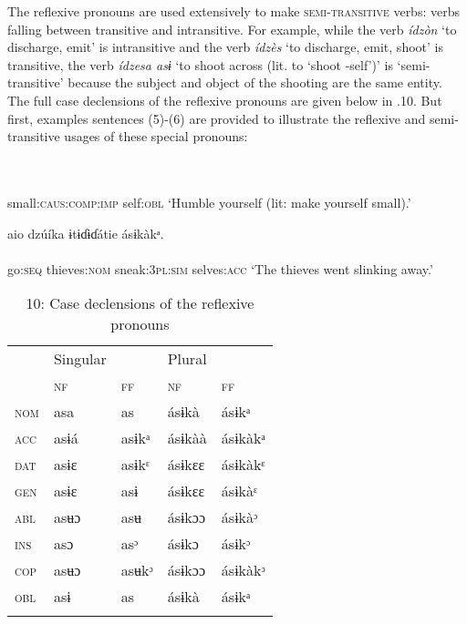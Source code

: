 The reflexive pronouns are used extensively to make \textsc{semi-transitive} verbs: verbs falling between transitive and intransitive. For example, while the verb \textit{ídzòn} ‘to discharge, emit’ is intransitive and the verb \textit{ídzès} ‘to discharge, emit, shoot’ is transitive, the verb \textit{ídzesa asɨ} ‘to shoot across (lit. to ‘shoot -self’)’ is ‘semi-transitive’ because the subject and object of the shooting are the same entity. The full case declensions of the reflexive pronouns are given below in .10. But first, examples sentences (5)-(6) are provided to illustrate the reflexive and semi-transitive usages of these special pronouns:




\ea\label{ex:}
 \\
    \\
small:\textsc{caus:comp:imp}   self:\textsc{obl}
\glt ‘Humble yourself (lit: make yourself small).’ 
\z




\ea\label{ex:}
aio     dzúíka   ɨtɨɗɨɗátie     ásɨkàkᵃ. \\
    \\
go:\textsc{seq}   thieves:\textsc{nom}   sneak:\textsc{3pl:sim} selves:\textsc{acc}
\glt ‘The thieves went slinking away.’ 
\z



\begin{table}
\caption{10: Case declensions of the reflexive pronouns}
\label{tab:5}


\begin{tabularx}{\textwidth}{XXXXX} & Singular &  & Plural & \\
\lsptoprule
& \textsc{nf} & \textsc{ff} & \textsc{nf} & \textsc{ff}\\
\textsc{nom} & asa & as & ásɨkà & ásɨkᵃ\\
\textsc{acc} & asɨá & asɨkᵃ & ásɨkàà & ásɨkàkᵃ\\
\textsc{dat} & asɨɛ & asɨkᵋ & ásɨkɛɛ & ásɨkàkᵋ\\
\textsc{gen} & asɨɛ & asɨ & ásɨkɛɛ & ásɨkàᵋ\\
\textsc{abl} & asʉɔ & asʉ & ásɨkɔɔ & ásɨkàᵓ\\
\textsc{ins} & asɔ & asᵓ & ásɨkɔ & ásɨkᵓ\\
\textsc{cop} & asʉɔ & asʉkᵓ & ásɨkɔɔ & ásɨkàkᵓ\\
\textsc{obl} & asɨ & as & ásɨkà & ásɨkᵃ\\
\lspbottomrule
\end{tabularx}
\end{table}


